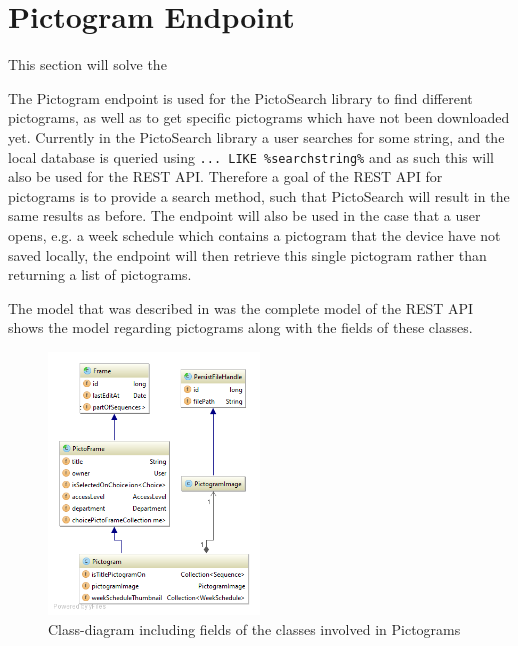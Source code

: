\section{Pictogram Endpoint}\label{pictogramendpoint}
This section will solve the 

The Pictogram endpoint is used for the PictoSearch library to find different pictograms, as well as to get specific pictograms which have not been downloaded yet.
Currently in the PictoSearch library a user searches for some string, and the local database is queried using \texttt{... LIKE \%searchstring\%} and as such this will also be used for the REST API.
Therefore a goal of the REST API for pictograms is to provide a search method, such that PictoSearch will result in the same results as before.
The endpoint will also be used in the case that a user opens, e.g. a week schedule which contains a pictogram that the device have not saved locally, the endpoint will then retrieve this single pictogram rather than returning a list of pictograms.

The model that was described in  was the complete model of the REST API  shows the model regarding pictograms along with the fields of these classes.

\begin{figure}[h]
    \centering
    \includegraphics[width=0.5\textwidth]{figures/diagram-pictogram.png}
    \caption{Class-diagram including fields of the classes involved in Pictograms}\label{fig:screenshot_newsearch}
\end{figure}

